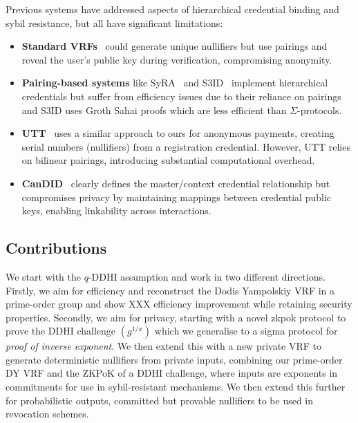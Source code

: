 Previous systems have addressed aspects of hierarchical credential binding and sybil resistance, but all have significant limitations:

\begin{itemize}
    
    \item \textbf{Standard VRFs}~\cite{hutchison_verifiable_2005, goldberg_nsec5_2015} could generate unique nullifiers but use pairings and reveal the user's public key during verification, compromising anonymity.
        
    \item \textbf{Pairing-based systems} like SyRA~\cite{crites_syra_2024} and S3ID~\cite{rabaninejad_attribute-based_2024} implement hierarchical credentials but suffer from efficiency issues due to their reliance on pairings and S3ID uses Groth Sahai proofs which are less efficient than $\Sigma$-protocols.
    
    \item \textbf{UTT}~\cite{tomescu2022utt} uses a similar approach to ours for anonymous payments, creating serial numbers (nullifiers) from a registration credential. However, UTT relies on bilinear pairings, introducing substantial computational overhead.
    
    \item \textbf{CanDID}~\cite{maram2021candid} clearly defines the master/context credential relationship but compromises privacy by maintaining mappings between credential public keys, enabling linkability across interactions.

\end{itemize}


\subsection{Contributions}\label{sec:vrf-contributions}
We start with the $q$-DDHI assumption and work in two different directions. Firstly, we aim for efficiency and reconstruct the Dodis Yampolskiy VRF in a prime-order group and show XXX efficiency improvement while retaining security properties. Secondly, we aim for privacy,  starting with a novel zkpok protocol to prove the DDHI challenge $(g^{1/x})$ which we generalise to a sigma protocol for \emph{proof of inverse exponent}. We then extend this with a new private VRF to generate deterministic nullifiers from private inputs, combining our prime-order DY VRF and the ZKPoK of a DDHI challenge, where inputs are exponents in commitments for use in sybil-resistant mechanisms. We then extend this further for probabilistic outputs, committed but provable nullifiers to be used in revocation schemes. 


